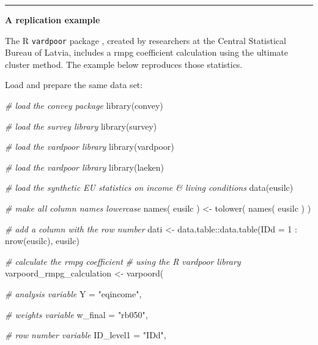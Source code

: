 \documentclass[
]{book}
\newenvironment{Shaded}{\begin{snugshade}}{\end{snugshade}}
\newcommand{\AttributeTok}[1]{\textcolor[rgb]{0.77,0.63,0.00}{#1}}
\newcommand{\CommentTok}[1]{\textcolor[rgb]{0.56,0.35,0.01}{\textit{#1}}}
\newcommand{\DecValTok}[1]{\textcolor[rgb]{0.00,0.00,0.81}{#1}}
\newcommand{\FunctionTok}[1]{\textcolor[rgb]{0.00,0.00,0.00}{#1}}
\newcommand{\NormalTok}[1]{#1}
\newcommand{\OtherTok}[1]{\textcolor[rgb]{0.56,0.35,0.01}{#1}}
\newcommand{\SpecialCharTok}[1]{\textcolor[rgb]{0.00,0.00,0.00}{#1}}
\newcommand{\StringTok}[1]{\textcolor[rgb]{0.31,0.60,0.02}{#1}}
\begin{document}
\begin{center}\rule{0.5\linewidth}{0.5pt}\end{center}

\textbf{A replication example}

The R \texttt{vardpoor} package \autocite{vardpoor}, created by researchers at the Central Statistical Bureau of Latvia, includes a rmpg coefficient calculation using the ultimate cluster method. The example below reproduces those statistics.

Load and prepare the same data set:

\begin{Shaded}
\begin{Highlighting}[]
\CommentTok{\# load the convey package}
\FunctionTok{library}\NormalTok{(convey)}

\CommentTok{\# load the survey library}
\FunctionTok{library}\NormalTok{(survey)}

\CommentTok{\# load the vardpoor library}
\FunctionTok{library}\NormalTok{(vardpoor)}

\CommentTok{\# load the vardpoor library}
\FunctionTok{library}\NormalTok{(laeken)}

\CommentTok{\# load the synthetic EU statistics on income \& living conditions}
\FunctionTok{data}\NormalTok{(eusilc)}

\CommentTok{\# make all column names lowercase}
\FunctionTok{names}\NormalTok{( eusilc ) }\OtherTok{\textless{}{-}} \FunctionTok{tolower}\NormalTok{( }\FunctionTok{names}\NormalTok{( eusilc ) )}

\CommentTok{\# add a column with the row number}
\NormalTok{dati }\OtherTok{\textless{}{-}}\NormalTok{ data.table}\SpecialCharTok{::}\FunctionTok{data.table}\NormalTok{(}\AttributeTok{IDd =} \DecValTok{1} \SpecialCharTok{:} \FunctionTok{nrow}\NormalTok{(eusilc), eusilc)}

\CommentTok{\# calculate the rmpg coefficient}
\CommentTok{\# using the R vardpoor library}
\NormalTok{varpoord\_rmpg\_calculation }\OtherTok{\textless{}{-}}
    \FunctionTok{varpoord}\NormalTok{(}
    
        \CommentTok{\# analysis variable}
        \AttributeTok{Y =} \StringTok{"eqincome"}\NormalTok{, }
        
        \CommentTok{\# weights variable}
        \AttributeTok{w\_final =} \StringTok{"rb050"}\NormalTok{,}
        
        \CommentTok{\# row number variable}
        \AttributeTok{ID\_level1 =} \StringTok{"IDd"}\NormalTok{,}


\end{Highlighting}
\end{Shaded}
\end{document}
